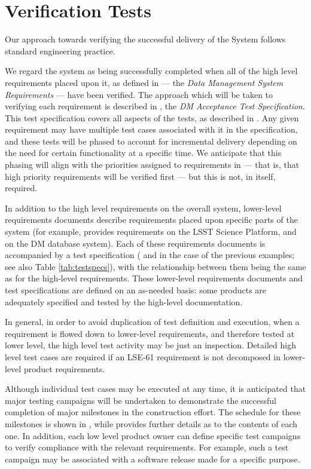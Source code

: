 \section{Verification Tests \label{sect:approach}}

Our approach towards verifying the successful delivery of the \product{} System follows standard engineering practice.

We regard the system as being successfully completed when all of the high level requirements placed upon it, as defined in  --- the \emph{Data Management System Requirements} --- have been verified.
The approach which will be taken to verifying each requirement is described in , the \emph{DM Acceptance Test Specification}.
This test specification covers all aspects of the tests, as described in .
Any given requirement may have multiple test cases associated with it in the specification, and these tests will be phased to account for incremental delivery depending on the need for certain functionality at a specific time.
We anticipate that this phasing will align with the priorities assigned to requirements in  --- that is, that high priority requirements will be verified first --- but this is not, in itself, required.

In addition to the high level requirements on the overall \product{} system, lower-level requirements documents describe requirements placed upon specific parts of the system (for example,  provides requirements on the LSST Science Platform, and  on the DM database system).
Each of these requirements documents is accompanied by a test specification ( and  in the case of the previous examples; see also Table \ref{tab:testspecs}), with the relationship between them being the same as for the high-level requirements.
These lower-level requirements documents and test specifications are defined on an as-needed basis: some \product{} products are adequately specified and tested by the high-level documentation.

In general, in order to avoid duplication of test definition and execution, when a requirement is flowed down to lower-level requirements, and therefore tested at lower level, the high level test activity may be just an inspection.
Detailed high level test cases are required if an LSE-61 requirement is not decomposed in lower-level product requirements.

Although individual test cases may be executed at any time, it is anticipated that major testing campaigns will be undertaken to demonstrate the successful completion of major milestones in the \product{} construction effort.
The schedule for these milestones is shown in , while  provides further details as to the contents of each one.
In addition, each low level product owner can define specific test campaigns to verify compliance with the relevant requirements.
For example, such a test campaign may be associated with a software release made for a specific purpose.

